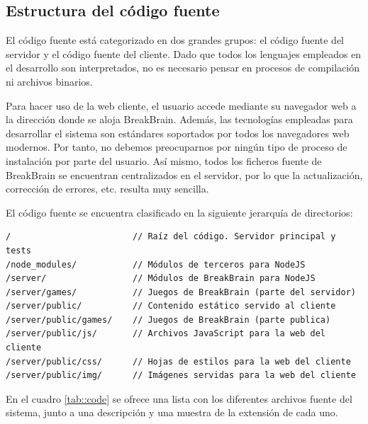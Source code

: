 \subsection{Estructura del código fuente}

El código fuente está categorizado en dos grandes grupos: el código fuente del servidor y el código fuente del cliente. Dado que todos los lenguajes empleados en el desarrollo son interpretados, no es necesario pensar en procesos de compilación ni archivos binarios.

Para hacer uso de la web cliente, el usuario accede mediante su navegador web a la dirección donde se aloja BreakBrain. Además, las tecnologías empleadas para desarrollar el sistema son estándares soportados por todos los navegadores web modernos. Por tanto, no debemos preocuparnos por ningún tipo de proceso de instalación por parte del usuario. Así mismo, todos los ficheros fuente de BreakBrain se encuentran centralizados en el servidor, por lo que la actualización, corrección de errores, etc. resulta muy sencilla.

El código fuente se encuentra clasificado en la siguiente jerarquía de directorios:

\begin{verbatim}
/                        // Raíz del código. Servidor principal y tests
/node_modules/           // Módulos de terceros para NodeJS 
/server/                 // Módulos de BreakBrain para NodeJS
/server/games/           // Juegos de BreakBrain (parte del servidor)
/server/public/          // Contenido estático servido al cliente
/server/public/games/    // Juegos de BreakBrain (parte publica)
/server/public/js/       // Archivos JavaScript para la web del cliente
/server/public/css/      // Hojas de estilos para la web del cliente
/server/public/img/      // Imágenes servidas para la web del cliente
\end{verbatim}

En el cuadro \ref{tab::code} se ofrece una lista con los diferentes archivos fuente del sistema, junto a una descripción y una muestra de la extensión de cada uno.

